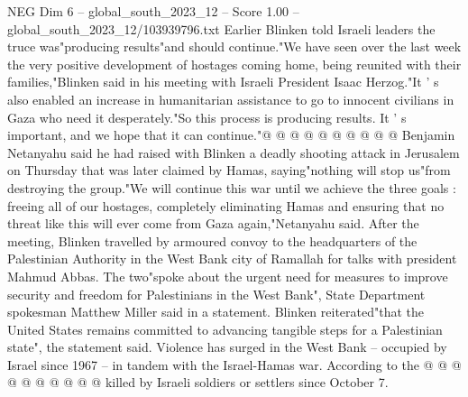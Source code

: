 \begin{textsample}{NEG Dim 6 – global\_south\_2023\_12 – Score 1.00 – global\_south\_2023\_12/103939796.txt}
Earlier Blinken told Israeli leaders the truce was"producing results"and should continue."We have seen over the last week the very positive development of hostages coming home, being reunited with their families,"Blinken said in his meeting with Israeli President Isaac Herzog."It ' s also enabled an increase in humanitarian assistance to go to innocent civilians in Gaza who need it desperately."So this process is producing results.
It ' s important, and we hope that it can continue."@ @ @ @ @ @ @ @ @ @ Benjamin Netanyahu said he had raised with Blinken a deadly shooting attack in Jerusalem on Thursday that was later claimed by Hamas, saying"nothing will stop us"from destroying the group."We will continue this war until we achieve the three goals : freeing all of our hostages, completely eliminating Hamas and ensuring that no threat like this will ever come from Gaza again,"Netanyahu said.
After the meeting, Blinken travelled by armoured convoy to the headquarters of the Palestinian Authority in the West Bank city of Ramallah for talks with president Mahmud Abbas.
The two"spoke about the urgent need for measures to improve security and freedom for Palestinians in the West Bank", State Department spokesman Matthew Miller said in a statement.
Blinken reiterated"that the United States remains committed to advancing tangible steps for a Palestinian state", the statement said.
Violence has surged in the West Bank -- occupied by Israel since 1967 -- in tandem with the Israel-Hamas war.
According to the @ @ @ @ @ @ @ @ @ @ killed by Israeli soldiers or settlers since October 7.

\end{textsample}
